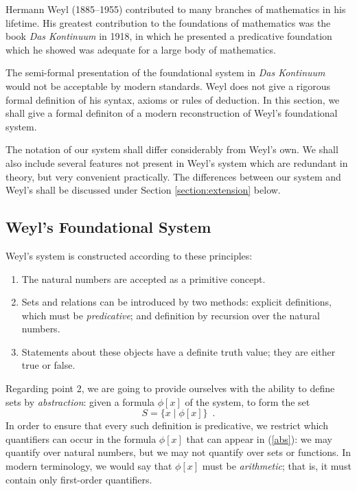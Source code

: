 \documentclass[acmtocl]{acmtrans2m}
\begin{document}
Hermann Weyl (1885--1955) contributed to
many branches of mathematics in his lifetime.  His greatest
contribution to the foundations of mathematics was the book
\emph{Das Kontinuum} \cite{weyl:kontinuum} in 1918, in which he
presented a predicative foundation which he showed was
adequate for a large body of mathematics.

The semi-formal presentation of the foundational system in \emph{Das Kontinuum} would not be acceptable by modern standards.  Weyl does not give a rigorous formal definition of his syntax, axioms or rules of deduction.  In this section, we shall give a formal definiton of a modern reconstruction of Weyl's foundational system.

\pagebreak

The notation of our system shall differ considerably from Weyl's own.
We shall also include several features not present in Weyl's system which are redundant in theory, but very convenient practically.
The differences between our system and Weyl's shall be discussed under Section \ref{section:extension}
below.

\subsection{Weyl's Foundational System}

Weyl's system is constructed according to these principles:
\begin{enumerate}
\item
The natural numbers are accepted as a primitive concept.
\item
Sets and relations can be introduced by two methods: explicit
definitions, which must be \emph{predicative}; and definition by
recursion over the natural numbers.
\item
Statements about these objects have a definite truth value; they are either true or false.
\end{enumerate}

Regarding point 2, we are going to provide ourselves with the ability to define sets by \emph{abstraction}: given a formula $\phi[x]$ of the system, to form the set
\begin{equation}
 \label{abs}
 S = \{ x \mid \phi[x] \} \enspace .
\end{equation}
In order to ensure that every such definition is predicative, we restrict which quantifiers can occur in the formula $\phi[x]$ that can appear in (\ref{abs}): we may quantify over natural numbers, but we may not quantify over sets or functions.  In modern terminology, we would say that $\phi[x]$ must be \emph{arithmetic}; that is, it must contain only first-order quantifiers.
\end{document}
